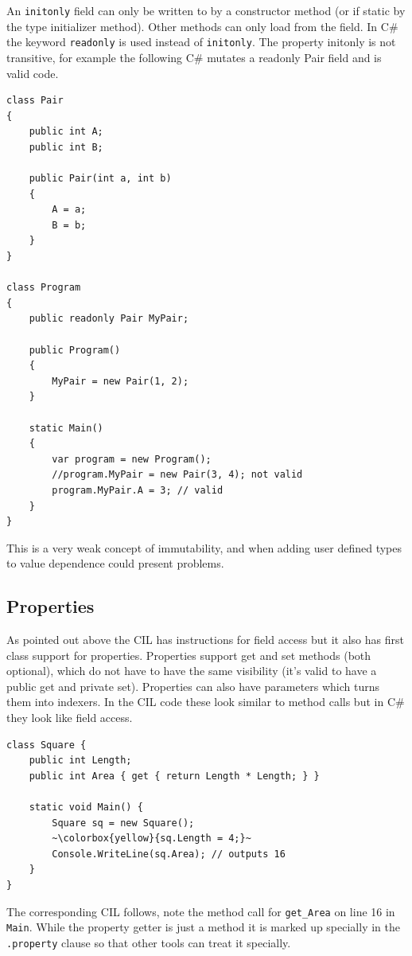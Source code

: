 \documentclass[english]{report}
\begin{document}
An \texttt{initonly} field can only be written to by a constructor method (or
if static by the type initializer method). Other methods can only load from the
field. In C\# the keyword \texttt{readonly} is used instead of
\texttt{initonly}. The property initonly is not transitive, for example the
following C\# mutates a readonly Pair field and is valid code.

\begin{lstlisting}[keywordstyle={\color{blue}},language=sharpc]
class Pair
{
	public int A;
	public int B;

	public Pair(int a, int b)
	{
		A = a;
		B = b;
	}
}

class Program
{
	public readonly Pair MyPair;

	public Program()
	{
		MyPair = new Pair(1, 2);
	}

	static Main()
	{
		var program = new Program();
		//program.MyPair = new Pair(3, 4); not valid
		program.MyPair.A = 3; // valid
	}
}
\end{lstlisting}


This is a very weak concept of immutability, and when adding user
defined types to value dependence could present problems.


\subsection{Properties}

As pointed out above the CIL has instructions for field access but it also has
first class support for properties. Properties support get and set methods
(both optional), which do not have to have the same visibility (it's valid to
have a public get and private set). Properties can also have parameters which
turns them into indexers.  In the CIL code these look similar to method calls
but in C\# they look like field access.

\begin{lstlisting}[keywordstyle={\color{blue}},language=sharpc, escapechar={~}]
class Square {
	public int Length;
	public int Area { get { return Length * Length; } }

	static void Main() {
		Square sq = new Square();
		~\colorbox{yellow}{sq.Length = 4;}~
		Console.WriteLine(sq.Area); // outputs 16
	}
}
\end{lstlisting}


The corresponding CIL follows, note the method call for \texttt{get\_Area}
on line 16 in \texttt{Main}. While the property getter is just a method
it is marked up specially in the \texttt{.property} clause so that
other tools can treat it specially. 
\end{document}

